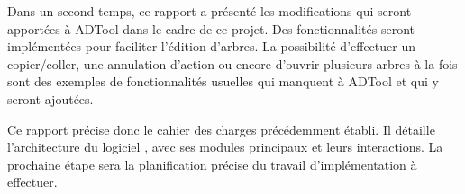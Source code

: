 	Dans un second temps, ce rapport a présenté les modifications qui seront apportées à ADTool dans le cadre de ce projet. Des fonctionnalités seront implémentées pour faciliter l'édition d'arbres. La possibilité d'effectuer un copier/coller, une annulation d'action ou encore d'ouvrir plusieurs arbres à la fois sont des exemples de fonctionnalités usuelles qui manquent à ADTool et qui y seront ajoutées.


	Ce rapport précise donc le cahier des charges précédemment établi. Il détaille l'architecture du logiciel \glasir{}, avec ses modules principaux et leurs interactions. La prochaine étape sera la planification précise du travail d'implémentation à effectuer.